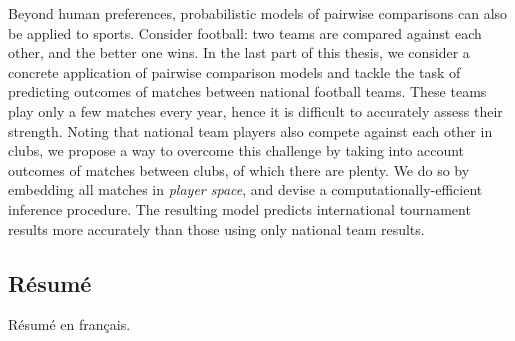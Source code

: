 Beyond human preferences, probabilistic models of pairwise comparisons can also be applied to sports.
Consider football: two teams are compared against each other, and the better one wins.
In the last part of this thesis, we consider a concrete application of pairwise comparison models and tackle the task of predicting outcomes of matches between national football teams.
These teams play only a few matches every year, hence it is difficult to accurately assess their strength.
Noting that national team players also compete against each other in clubs, we propose a way to overcome this challenge by taking into account outcomes of matches between clubs, of which there are plenty.
We do so by embedding all matches in \emph{player space}, and devise a computationally-efficient inference procedure.
The resulting model predicts international tournament results more accurately than those using only national team results.


\cleardoublepage

\begin{otherlanguage}{french}
\chapter*{Résumé}

Résumé en français.
\end{otherlanguage}
